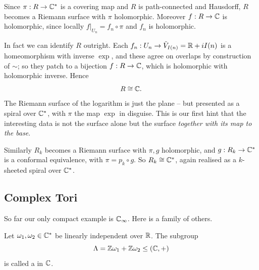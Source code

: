 \documentclass[a4paper]{scrartcl}
\newcommand{\Cinf}{\C_\infty}
\newcommand{\Cs}{\C^*}
\begin{document}
\begin{example}
	Since $\pi : R \to \Cs$ is a covering map and $R$ is path-connected and Hausdorff,
	$R$ becomes a Riemann surface with $\pi$ holomorphic. Moreover $f : R \to \mathbb{C}$ is
	holomorphic, since locally $f|_{U_n} = f_n \circ \pi$ and $f_n$ is holomorphic.

	In fact we can identify $R$ outright. Each $f_n : U_n \to \tilde V_{I(n)} = \mathbb{R} + iI(n)$
	is a homeomorphism with inverse $\exp$, and these agree on overlaps by construction of
	$\sim$; so they patch to a bijection $f: R \to \mathbb{C}$, which is holomorphic with
	holomorphic inverse. Hence
	$$
	R \cong \mathbb{C}.
	$$
	The Riemann surface of the logarithm is just the plane -- but presented as a spiral
	over $\Cs$, with $\pi$ the map $\exp$ in disguise. This is our first hint that the
	interesting data is not the surface alone but the surface \emph{together with its map
	to the base}.
\end{example}

\begin{example}
	Similarly $R_k$ becomes a Riemann surface with $\pi, g$ holomorphic, and $g : R_k \to \Cs$
	is a conformal equivalence, with $\pi = p_k \circ g$. So $R_k \cong \Cs$, again realised
	as a $k$-sheeted spiral over $\Cs$.
\end{example}

\subsection{Complex Tori}\label{subsec:tori}

So far our only compact example is $\Cinf$. Here is a family of others.

\begin{definition}[Lattice]
	Let $\omega_1, \omega_2 \in \Cs$ be linearly independent over $\mathbb{R}$. The subgroup
	$$
	\Lambda = \mathbb{Z}\omega_1 + \mathbb{Z} \omega_2 \leq (\mathbb{C}, +)
	$$
	is called a  in $\mathbb{C}$.
\end{definition}

\begin{center}
\end{center}
\end{document}
